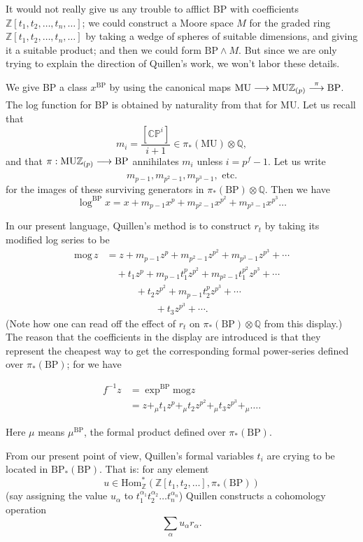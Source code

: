 \documentclass[../main]{subfiles}
\begin{document}
It would not really give us any trouble to afflict BP with coefficients $\mathbb Z[t_1, t_2, \ldots, t_n, \ldots]$; we could construct a Moore space $M$ for the graded ring $\mathbb Z[t_1, t_2, \ldots, t_n, \ldots]$ by taking a wedge of spheres of suitable dimensions, and giving it a suitable product; and then we could form $\mathrm{BP} \wedge M$. But since we are only trying to explain the direction of Quillen's work, we won't labor these details.

We give BP a class $x^{\mathrm{BP}}$ by using the canonical maps $\mathrm{MU} \lar{} \mathrm{MU} \mathbb Z_{(p)} \lar{\pi} \mathrm{BP}$. The log function for BP is obtained by naturality from that for MU. Let us recall that \[m_i = \frac {[\mathbb {CP}^i]} {i + 1} \in \pi_\ast(\mathrm{MU}) \otimes \mathbb Q,\] and that $\pi : \mathrm{MU} \mathbb Z_{(p)} \lar{} \mathrm{BP}$ annihilates $m_i$ unless $i = p^f - 1$. Let us write \[m_{p - 1}, m_{p^2 - 1}, m_{p^3 - 1}, \text { etc.}\] for the images of these surviving generators in $\pi_\ast(\mathrm{BP}) \otimes \mathbb Q$. Then we have \[\log^{\mathrm{BP}} x = x + m_{p - 1} x^p + m_{p^2 - 1} x^{p^2} + m_{p^3 - 1} x^{p^3} \ldots\] 

In our present language, Quillen's method is to construct $r_t$ by taking its modified log series to be 
\[
\begin{aligned}
\mathrm{mog}\,z
&=z+m_{p-1}z^p+m_{p^2-1}z^{p^2}+m_{p^3-1}z^{p^3}+\cdots\\
&\quad{}+t_1z^p+m_{p-1}t_1^pz^{p^2}+m_{p^2-1}t_1^{p^2}z^{p^3}+\cdots\\
&\qquad\quad{}+t_2z^{p^2}+m_{p-1}t_2^pz^{p^3}+\cdots\\
&\qquad\qquad\quad{}+t_3z^{p^3}+\cdots.
\end{aligned}
\]
(Note how one can read off the effect of $r_t$ on $\pi_\ast(\mathrm{BP}) \otimes \mathbb Q$ from this display.) The reason that the coefficients in the display are introduced is that they represent the cheapest way to get the corresponding formal power-series defined over $\pi_\ast(\mathrm{BP})$; for we have

\begin{align*}
f^{-1} z & = \exp^{\mathrm{BP}} \mathrm{mog} z \\ & = z +_\mu t_1 z^{p} +_\mu t_2 z^{p^2} +_\mu t_3 z^{p^3} +_\mu \ldots.
\end{align*}

Here $\mu$ means $\mu^{\mathrm{BP}}$, the formal product defined over $\pi_\ast(\mathrm{BP})$.

From our present point of view, Quillen's formal variables $t_i$ are crying to be located in $\mathrm{BP}_\ast(\mathrm{BP})$. That is: for any element \[u \in \mathrm{Hom}_{\mathbb Z}^\ast(\mathbb Z[t_1, t_2, \ldots], \pi_\ast(\mathrm {BP}))\] (say assigning the value $u_\alpha$ to $t_1^{\alpha_1} t_2^{\alpha_2} \ldots t_n^{\alpha_n}$) Quillen constructs a cohomology operation \[\sum_\alpha u_\alpha r_\alpha.\] 
\end{document}
